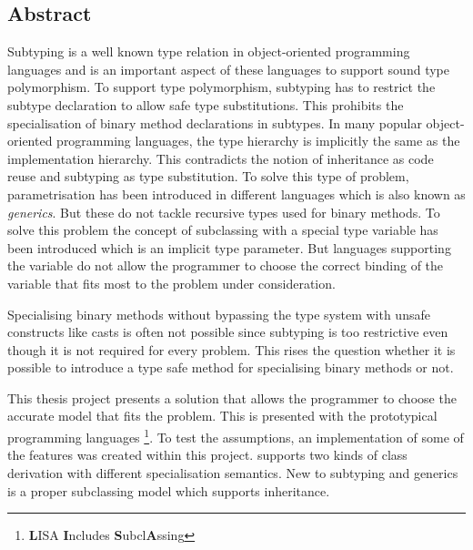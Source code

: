 %
%
\subsection*{Abstract}
Subtyping is a well known type relation in object-oriented
programming languages and is an important aspect of these languages
to support sound type polymorphism. To support type polymorphism,
subtyping has to restrict the subtype declaration to allow safe type
substitutions. This prohibits the specialisation of binary method declarations 
in subtypes. In many popular object-oriented programming languages, the type
hierarchy is implicitly the same as the implementation hierarchy. This
contradicts the notion of inheritance as code reuse and subtyping as type
substitution. To solve this type of problem, parametrisation has been introduced in
different languages which is also known as \emph{generics}. But these do not
tackle recursive types used for binary methods. To solve this problem
the concept of subclassing with a special type variable \mytype has been
introduced which is an implicit type parameter. But languages supporting
the \mytype variable do not allow the programmer to choose the correct
binding of the variable that fits most to the problem under consideration.

Specialising binary methods without bypassing the type system with
unsafe constructs like casts is often not possible since subtyping is
too restrictive even though it is not required for every problem. This
rises the question whether it is possible to introduce a type safe method
for specialising binary methods or not.

This thesis project presents a solution that allows the programmer to
choose the accurate model that fits the problem. This is presented with
the prototypical programming languages \ooplss\footnote{{\bf L}ISA
{\bf I}ncludes {\bf S}ubcl{\bf A}ssing}. To test the assumptions,
an implementation of some of the features was created within this
project. \ooplss supports two kinds of class derivation with different
specialisation semantics. New to subtyping and generics is a proper
subclassing model which supports inheritance.

